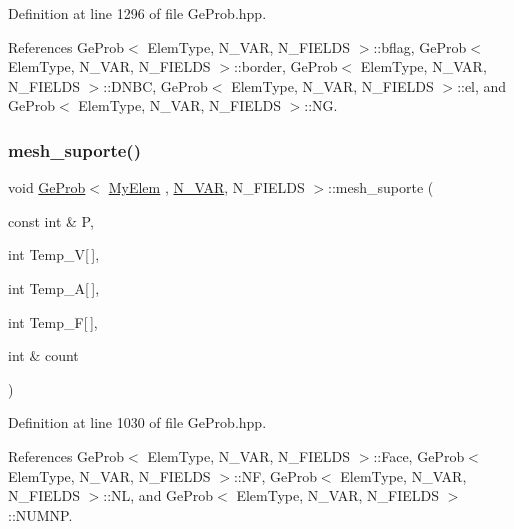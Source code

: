 Definition at line 1296 of file Ge\+Prob.\+hpp.



References Ge\+Prob$<$ Elem\+Type, N\+\_\+\+V\+A\+R, N\+\_\+\+F\+I\+E\+L\+D\+S $>$\+::bflag, Ge\+Prob$<$ Elem\+Type, N\+\_\+\+V\+A\+R, N\+\_\+\+F\+I\+E\+L\+D\+S $>$\+::border, Ge\+Prob$<$ Elem\+Type, N\+\_\+\+V\+A\+R, N\+\_\+\+F\+I\+E\+L\+D\+S $>$\+::\+D\+N\+BC, Ge\+Prob$<$ Elem\+Type, N\+\_\+\+V\+A\+R, N\+\_\+\+F\+I\+E\+L\+D\+S $>$\+::el, and Ge\+Prob$<$ Elem\+Type, N\+\_\+\+V\+A\+R, N\+\_\+\+F\+I\+E\+L\+D\+S $>$\+::\+NG.

\mbox{\label{classGeProb_ab33e0027b5ae2b712b91690b8cb75e90}} 
\subsubsection{\texorpdfstring{mesh\+\_\+suporte()}{mesh\_suporte()}}
{\footnotesize\ttfamily void \hyperlink{classGeProb}{Ge\+Prob}$<$ \hyperlink{DG__Prob_8h_a83cd887ced9a6587428f267e50cd4787}{My\+Elem} , \hyperlink{classED__Prob_a4e7d2ff1a8e435e336fb00c527224b5a}{N\+\_\+\+V\+AR}, N\+\_\+\+F\+I\+E\+L\+DS $>$\+::mesh\+\_\+suporte (\begin{DoxyParamCaption}\item[{const int \&}]{P,  }\item[{int}]{Temp\+\_\+V\mbox{[}$\,$\mbox{]},  }\item[{int}]{Temp\+\_\+A\mbox{[}$\,$\mbox{]},  }\item[{int}]{Temp\+\_\+F\mbox{[}$\,$\mbox{]},  }\item[{int \&}]{count }\end{DoxyParamCaption})\hspace{0.3cm}{\ttfamily [inherited]}}



Definition at line 1030 of file Ge\+Prob.\+hpp.



References Ge\+Prob$<$ Elem\+Type, N\+\_\+\+V\+A\+R, N\+\_\+\+F\+I\+E\+L\+D\+S $>$\+::\+Face, Ge\+Prob$<$ Elem\+Type, N\+\_\+\+V\+A\+R, N\+\_\+\+F\+I\+E\+L\+D\+S $>$\+::\+NF, Ge\+Prob$<$ Elem\+Type, N\+\_\+\+V\+A\+R, N\+\_\+\+F\+I\+E\+L\+D\+S $>$\+::\+NL, and Ge\+Prob$<$ Elem\+Type, N\+\_\+\+V\+A\+R, N\+\_\+\+F\+I\+E\+L\+D\+S $>$\+::\+N\+U\+M\+NP.

\mbox{\label{classGeProb_a79ef11abf1d43923fb5a3613a3fa654e}} 
